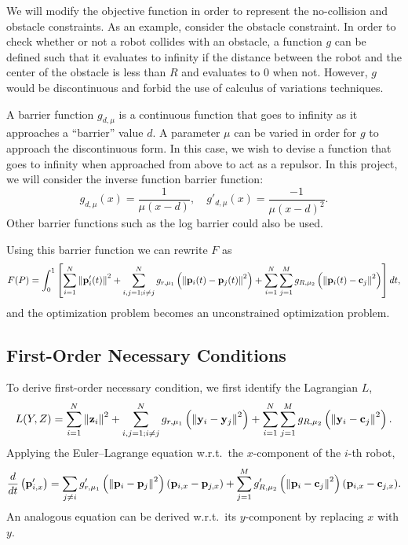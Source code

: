 \documentclass[11pt]{article}
\begin{document}
We will modify the objective function in order to represent the no-collision and obstacle constraints. As an example, consider the obstacle constraint. In order to check whether or not a robot collides with an obstacle, a function \(g\) can be defined such that it evaluates to infinity if the distance between the robot and the center of the obstacle is less than \(R\) and evaluates to 0 when not. However, \(g\) would be discontinuous and forbid the use of calculus of variations techniques.

A barrier function \(g_{d,\mu}\) is a continuous function that goes to infinity as it approaches a ``barrier'' value \(d\). A parameter \(\mu\) can be varied in order for \(g\) to approach the discontinuous form. In this case, we wish to devise a function that goes to infinity when approached from above to act as a repulsor. In this project, we will consider the inverse function barrier function:
    \begin{equation}
        g_{d,\mu}(x) = \frac{1}{\mu(x-d)},
        \quad
        g'_{d,\mu}(x) = \frac{-1}{\mu(x-d)^2}.
    \end{equation}
Other barrier functions such as the log barrier could also be used.

Using this barrier function we can rewrite \(F\) as
\begin{equation}
    F(P) = \int_0^1 \left[ \sum_{i=1}^{N} \left\lVert \mathbf{p}'_i(t) \right\rVert^2 + \sum_{i,j = 1; i \neq j}^{N} g_{r,\mu_1}\left( \left\lVert \mathbf{p}_i(t) - \mathbf{p}_j(t) \right\rVert^2 \right) + \sum_{i=1}^{N} \sum_{j=1}^{M} g_{R,\mu_2}\left( \left\lVert \mathbf{p}_i(t) - \mathbf{c}_j \right\rVert^2 \right) \right] dt,
\end{equation}
and the optimization problem becomes an unconstrained optimization problem.

\subsection{First-Order Necessary Conditions}

To derive first-order necessary condition, we first identify the Lagrangian \(L\),
\begin{equation}
    L(Y,Z) = \sum_{i=1}^{N} \left\lVert \mathbf{z}_i \right\rVert^2 + \sum_{i,j = 1; i \neq j}^{N} g_{r,\mu_1}\left( \left\lVert \mathbf{y}_i - \mathbf{y}_j \right\rVert^2 \right) + \sum_{i=1}^{N} \sum_{j=1}^{M} g_{R,\mu_2}\left( \left\lVert \mathbf{y}_i - \mathbf{c}_j \right\rVert^2 \right).
\end{equation}
Applying the Euler--Lagrange equation w.r.t.\ the \(x\)-component of the \(i\)-th robot,
\begin{equation}
    \frac{d}{dt}\left(\mathbf{p}'_{i,x}\right) = \sum_{j \neq i} g'_{r,\mu_1}\left( \left\lVert \mathbf{p}_i - \mathbf{p}_j \right\rVert^2 \right) (\mathbf{p}_{i,x} - \mathbf{p}_{j,x}) + \sum_{j=1}^{M} g'_{R,\mu_2}\left( \left\lVert \mathbf{p}_i - \mathbf{c}_j \right\rVert^2 \right) (\mathbf{p}_{i,x} - \mathbf{c}_{j,x}).
    \label{eq:EL}
\end{equation}
An analogous equation can be derived w.r.t.\ its \(y\)-component by replacing \(x\) with \(y\).
\end{document}
